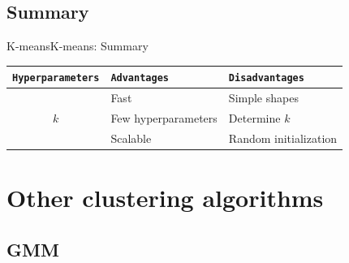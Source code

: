 \documentclass[10pt,compress]{beamer} %
\begin{document}
\subsection{Summary}
\begin{frame}[fragile]{K-means}{K-means: Summary}
	\begin{center}
	\begin{tabular}{cll}\hline
	 	\texttt{Hyperparameters}  & \texttt{Advantages}  & \texttt{Disadvantages} \\\hline
	 	                 & Fast                 & Simple shapes \\
	    $k$	             & Few hyperparameters  & Determine $k$ \\
	 	                 & Scalable             & Random initialization \\
	 	\hline
	\end{tabular}
	\end{center}
\end{frame}


\section{Other clustering algorithms}

\subsection{GMM}
\end{document}
